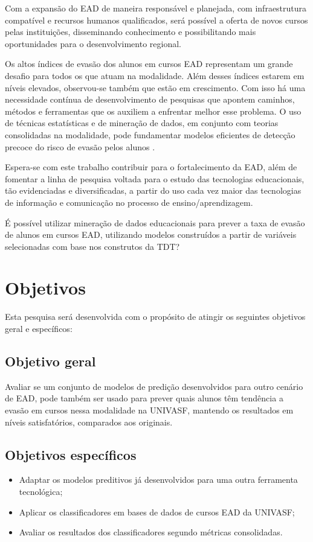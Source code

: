 Com a expansão do EAD de maneira responsável e planejada, com infraestrutura
compatível e recursos humanos qualificados, será possível a oferta de novos
cursos pelas instituições, disseminando conhecimento e possibilitando mais
oportunidades para o desenvolvimento regional.

Os altos índices de evasão dos alunos em cursos EAD representam um grande
desafio para todos os que atuam na modalidade. Além desses índices estarem em
níveis elevados, observou-se também que estão em crescimento. Com isso há uma
necessidade contínua de desenvolvimento de pesquisas que apontem caminhos,
métodos e ferramentas que os auxiliem a enfrentar melhor esse problema. O uso de
técnicas estatísticas e de mineração de dados, em conjunto com teorias
consolidadas na modalidade, pode fundamentar modelos eficientes de detecção
precoce do risco de evasão pelos alunos \cite{ramos2016abordagem}.

Espera-se com este trabalho contribuir para o fortalecimento da EAD, além de
fomentar a linha de pesquisa voltada para o estudo das tecnologias educacionais,
tão evidenciadas e diversificadas, a partir do uso cada vez maior das
tecnologias de informação e comunicação no processo de ensino/aprendizagem.

É possível utilizar mineração de dados educacionais para prever a taxa de evasão
de alunos em cursos EAD, utilizando modelos construídos a partir de variáveis
selecionadas com base nos construtos da TDT?

\section{Objetivos}

Esta pesquisa será desenvolvida com o propósito de atingir os seguintes
objetivos geral e específicos:

\subsection{Objetivo geral}

Avaliar se um conjunto de modelos de predição desenvolvidos para outro cenário
de EAD, pode também ser usado para prever quais alunos têm tendência a evasão em
cursos nessa modalidade na UNIVASF, mantendo os resultados em níveis
satisfatórios, comparados aos originais.

\subsection{Objetivos específicos}
\begin{itemize}
  \item Adaptar os modelos preditivos já desenvolvidos para uma outra ferramenta
  tecnológica;
  \item Aplicar os classificadores em bases de dados de cursos EAD da UNIVASF;
  \item Avaliar os resultados dos classificadores segundo métricas consolidadas.
\end{itemize}
